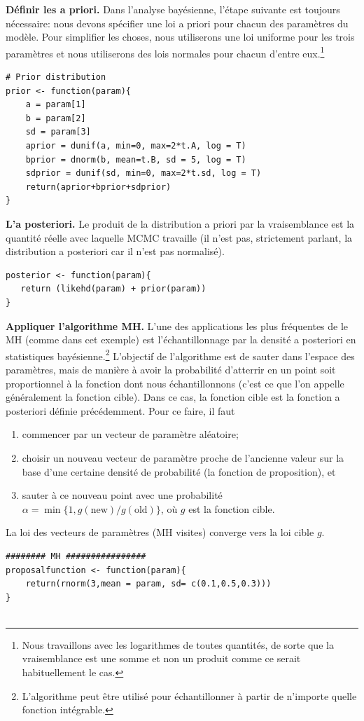 \begin{Exemple}
\item \textbf{D\'efinir les a priori.} Dans l'analyse bay\'esienne, l'\'etape
suivante est toujours n\'ecessaire: nous devons sp\'ecifier une loi a priori pour chacun des param\`etres du mod\`ele. Pour simplifier les choses, nous utiliserons une loi uniforme pour les trois param\`etres et nous utiliserons des lois normales pour chacun d'entre eux.\footnote{Nous travaillons avec les logarithmes de toutes quantit\'es, de sorte que la vraisemblance est une somme et non un produit comme ce serait habituellement le cas.} 
\begin{lstlisting}
# Prior distribution
prior <- function(param){
    a = param[1]
    b = param[2]
    sd = param[3]
    aprior = dunif(a, min=0, max=2*t.A, log = T)
    bprior = dnorm(b, mean=t.B, sd = 5, log = T)
    sdprior = dunif(sd, min=0, max=2*t.sd, log = T)
    return(aprior+bprior+sdprior)
}
\end{lstlisting}

\item \textbf{L'a posteriori.} Le produit de la distribution a priori par la vraisemblance est la quantit\'e r\'eelle avec laquelle MCMC travaille (il n'est pas, strictement parlant, la distribution a posteriori car il n'est pas normalis\'e).

\begin{lstlisting}
posterior <- function(param){
   return (likehd(param) + prior(param))
}
\end{lstlisting}
 \item \textbf{Appliquer l'algorithme MH.} L'une des applications les plus fr\'equentes de le MH (comme dans cet exemple) est l'\'echantillonnage par la densit\'e a posteriori en statistiques bay\'esienne.\footnote{L'algorithme peut être utilis\'e pour \'echantillonner \`a partir de n'importe quelle fonction int\'egrable.} L'objectif de l'algorithme est de sauter dans l'espace des param\`etres, mais de mani\`ere \`a avoir la probabilit\'e d'atterrir en un point soit proportionnel \`a la fonction dont nous \'echantillonnons (c'est ce que l'on appelle g\'en\'eralement la fonction cible). Dans ce cas, la fonction cible est la fonction a posteriori d\'efinie pr\'ec\'edemment. \newl Pour ce faire, il faut 
\begin{enumerate}[noitemsep]
\item commencer par un vecteur de param\`etre al\'eatoire;
\item choisir un nouveau vecteur de param\`etre proche de l'ancienne valeur sur la base d'une certaine densit\'e de probabilit\'e (la fonction de proposition), et 
\item sauter \`a ce nouveau point avec une probabilit\'e $\alpha=\min\{1,g(\text{new})/g(\text{old})\}$, où $g$ est la fonction cible.\end{enumerate}
La loi des vecteurs de param\`etres (MH visites) converge vers la loi cible  $g$.
\begin{lstlisting}
######## MH ################
proposalfunction <- function(param){
    return(rnorm(3,mean = param, sd= c(0.1,0.5,0.3)))
}
 

\end{lstlisting}
\end{Exemple}
